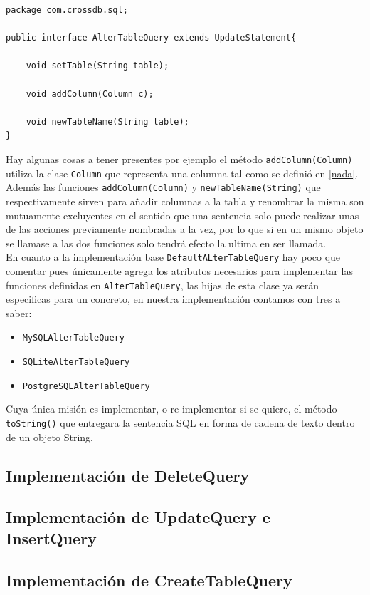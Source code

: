 \begin{lstlisting}[title=interfaz AlterTableQuery]
package com.crossdb.sql;

public interface AlterTableQuery extends UpdateStatement{
	
	void setTable(String table);
	
	void addColumn(Column c);
	
	void newTableName(String table);
}
\end{lstlisting}
Hay algunas cosas a tener presentes por ejemplo el método \verb=addColumn(Column)= utiliza la clase \verb=Column= que representa una columna tal como se definió en \ref{nada}. Además las funciones \verb=addColumn(Column)= y \verb=newTableName(String)= que respectivamente sirven para añadir columnas a la tabla y renombrar la misma son mutuamente excluyentes en el sentido que una sentencia solo puede realizar unas de las acciones previamente nombradas a la vez, por lo que si en un mismo objeto se llamase a las dos funciones solo tendrá efecto la ultima en ser llamada.\\

En cuanto a la implementación base \verb=DefaultALterTableQuery= hay poco que comentar pues únicamente agrega los atributos necesarios para implementar las funciones definidas en \verb=AlterTableQuery=, las hijas de esta clase ya serán especificas para un \dd concreto, en nuestra implementación contamos con tres a saber:
\begin{itemize}
\item \verb=MySQLAlterTableQuery=
\item \verb=SQLiteAlterTableQuery=
\item \verb=PostgreSQLAlterTableQuery=
\end{itemize}
Cuya única misión es implementar, o re-implementar si se quiere, el método \verb=toString()= que entregara la sentencia SQL en forma de cadena de texto dentro de un objeto String.
\subsection{Implementación de DeleteQuery}




\subsection{Implementación de UpdateQuery e InsertQuery}




\subsection{Implementación de CreateTableQuery}




